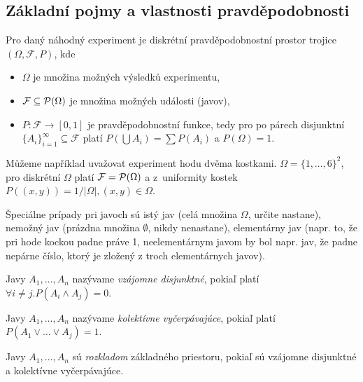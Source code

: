 \subsection{Základní pojmy a vlastnosti pravděpodobnosti}

\begin{definition}
Pro daný náhodný experiment je diskrétní pravděpodobnostní prostor trojice
$(\Omega, \mathcal{F}, P)$,
kde
\begin{itemize}
    \item $\Omega$ je množina možných výsledků experimentu,
    \item $\mathcal{F} \subseteq \mathcal{P}(\Omega)$ je množina možných události (javov),
    \item $P : \mathcal{F} \to [0,1]$ je pravděpodobnostní funkce, tedy
        pro po párech disjunktní $\{A_i\}_{i=1}^\infty \subseteq \mathcal{F}$ platí
        $P(\bigcup A_i) = \sum P(A_i)$ a $P(\Omega) = 1$.
\end{itemize}
\end{definition}

\begin{example}
    Můžeme například uvažovat experiment hodu dvěma kostkami.
    $\Omega = \{1,\ldots,6\}^2$, pro diskrétní $\Omega$ platí
    $\mathcal{F} = \mathcal{P}(\Omega)$ a z~uniformity kostek
    $P((x,y)) = 1/\lvert \Omega \rvert, (x,y) \in \Omega$.
\end{example}

Špeciálne prípady pri javoch sú istý jav (celá množina $\Omega$, určite nastane),
nemožný jav (prázdna množina $\emptyset$, nikdy nenastane),
elementárny jav (napr. to, že pri hode kockou padne práve 1,
neelementárnym javom by bol napr. jav, že padne nepárne číslo,
ktorý je zložený z troch elementárnych javov).

\begin{definition}
	Javy $A_1, \ldots, A_n$ nazývame {\em vzájomne disjunktné}, 
	pokiaľ platí $\forall i \neq j.P(A_i \land A_j)=0$.
\end{definition}

\begin{definition}
	Javy $A_1, \ldots, A_n$ nazývame {\em kolektívne vyčerpávajúce}, %
	pokiaľ platí $P(A_1 \lor \ldots \lor A_j)=1$.
\end{definition}

\begin{definition}
	Javy $A_1, \ldots, A_n$ sú {\em rozkladom} základného priestoru,
	pokiaľ sú vzájomne disjunktné a kolektívne vyčerpávajúce.
\end{definition}

